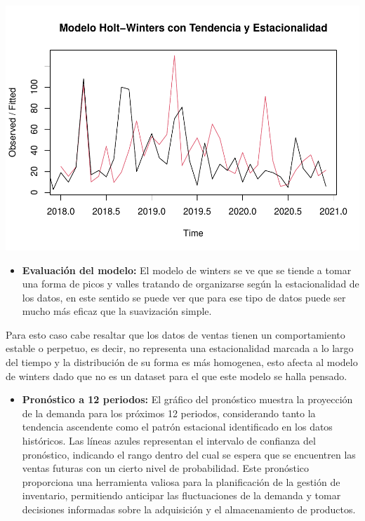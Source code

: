 \documentclass[
]{book}
\providecommand{\tightlist}{%
  \setlength{\itemsep}{0pt}\setlength{\parskip}{0pt}}
\begin{document}
\includegraphics{_main_files/figure-latex/unnamed-chunk-26-1.pdf}

\begin{itemize}
\tightlist
\item
  \textbf{Evaluación del modelo:} El modelo de winters se ve que se tiende a tomar una forma de picos y valles tratando de organizarse según la estacionalidad de los datos, en este sentido se puede ver que para ese tipo de datos puede ser mucho más eficaz que la suavización simple.
\end{itemize}

Para esto caso cabe resaltar que los datos de ventas tienen un comportamiento estable o perpetuo, es decir, no representa una estacionalidad marcada a lo largo del tiempo y la distribución de su forma es más homogenea, esto afecta al modelo de winters dado que no es un dataset para el que este modelo se halla pensado.

\begin{itemize}
\tightlist
\item
  \textbf{Pronóstico a 12 periodos:} El gráfico del pronóstico muestra la proyección de la demanda para los próximos 12 periodos, considerando tanto la tendencia ascendente como el patrón estacional identificado en los datos históricos. Las líneas azules representan el intervalo de confianza del pronóstico, indicando el rango dentro del cual se espera que se encuentren las ventas futuras con un cierto nivel de probabilidad. Este pronóstico proporciona una herramienta valiosa para la planificación de la gestión de inventario, permitiendo anticipar las fluctuaciones de la demanda y tomar decisiones informadas sobre la adquisición y el almacenamiento de productos.
\end{itemize}
\end{document}
